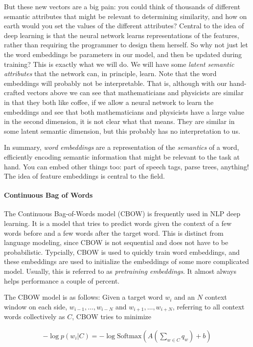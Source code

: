 \documentclass[fleqn,10pt]{SelfArx} %
\begin{document}
But these new vectors are a big pain: you could think of thousands of different semantic attributes that might be relevant to determining
similarity, and how on earth would you set the values of the different attributes? Central to the idea of deep learning is that the neural
network learns representations of the features, rather than requiring the programmer to design them herself. So why not just let the word
embeddings be parameters in our model, and then be updated during training? This is exactly what we will do. We will have some \textit{latent semantic attributes} that the network can, in principle, learn. Note that the word embeddings will probably not be interpretable. That is,
although with our hand-crafted vectors above we can see that mathematicians and physicists are similar in that they both like coffee,
if we allow a neural network to learn the embeddings and see that both mathematicians and physicists have a large value in the second
dimension, it is not clear what that means. They are similar in some latent semantic dimension, but this probably has no interpretation to
us.

In summary, \textit{word embeddings} are a representation of the \textit{semantics} of a word, efficiently encoding semantic information that might be relevant to the task at hand. You can embed other things too: part of speech tags, parse trees, anything! The idea of feature embeddings is central to the field.

\paragraph{Continuous Bag of Words} The Continuous Bag-of-Words model (CBOW) is frequently used in NLP deep learning. It is a model that tries to predict words given the context of a few words before and a few words after the target word. This is distinct from language modeling, since CBOW is not sequential and does not have to be probabilistic. Typcially, CBOW is used to quickly train word embeddings, and these embeddings are used to initialize the embeddings of some more complicated model. Usually, this is referred to as \textit{pretraining embeddings}. It almost always helps performance a couple of percent.

The CBOW model is as follows: Given a target word $w_i$ and an $N$ context window on each side, $w_{i-1}, \dots, w_{i-N}$ and $w_{i+1}, \dots, w_{i+N}$, referring to all context words collectively as $C$, CBOW tries to minimize

\begin{align}-\log p(w_i | C) = -\log \text{Softmax}(A(\sum_{w \in C} q_w) + b)\end{align}
\end{document}
